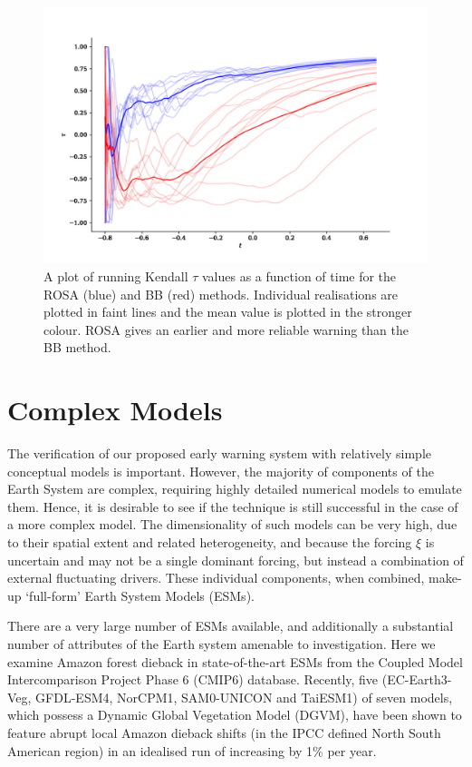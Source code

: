 \begin{figure}
\includegraphics[width=\textwidth,keepaspectratio]{figure3}
\caption[A comparison of ROSA and BB]{A plot of running Kendall $\tau$ values as a function of time for the ROSA (blue) and BB (red) methods.
  Individual realisations are plotted in faint lines and the mean value is plotted in the stronger colour. ROSA gives an earlier and more reliable warning than the BB 
method.}\label{fig:boers_method}
\end{figure}

\section{Complex Models}
The verification of our proposed early warning system with relatively simple conceptual models is important.
However, the majority of components of the Earth System are complex, requiring highly detailed numerical models to emulate them. Hence, it is 
desirable to see if the technique is still successful in the case of
a more complex model. The dimensionality of such models can be very high, due to their spatial extent and related heterogeneity, and 
because the forcing $\xi$ is uncertain and may not be a single dominant forcing,  but instead a combination of external fluctuating drivers.
These individual components, when combined, make-up `full-form' Earth System Models (ESMs).

There are a very large number of ESMs available, and additionally a substantial number of attributes of the Earth system amenable to investigation. Here we 
examine Amazon forest dieback in state-of-the-art ESMs from the Coupled Model Intercomparison  Project Phase 6 (CMIP6)\cite{Eyring2016} database. Recently,
five (EC-Earth3-Veg, GFDL-ESM4, NorCPM1, SAM0-UNICON and TaiESM1) of seven models, which possess a Dynamic Global Vegetation Model
(DGVM), have been shown to feature abrupt local Amazon dieback shifts (in the IPCC defined North South American region) in an idealised run
of increasing  by 1\% per year\cite{Parry2022}.


